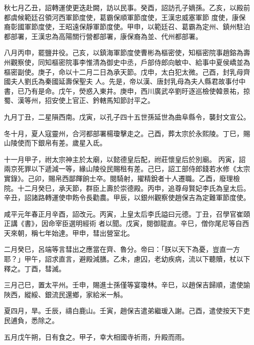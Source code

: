 \begin{pinyinscope}
 秋七月乙丑，詔轉運使更迭赴闕，訪以民事。癸酉，詔訪孔子嫡孫。乙亥，以殿前都虞候範廷召領河西軍節度使，葛霸保順軍節度使，王漢忠威塞軍節
 度使，康保裔彰國軍節度使，王昭遠保靜軍節度使。甲申，以範廷召、葛霸為定州、鎮州駐泊都部署，王漢忠為高陽關行營都部署，康保裔為並、代州都部署。



 八月丙申，罷鹽井役。己亥，以鎮海軍節度使曹彬為樞密使，知樞密院事趙鎔為壽州觀察使，同知樞密院事李惟清為御史中丞，戶部侍郎向敏中、給事中夏侯嶠並為樞密副使。庚子，命以十二月二日為承天節。戊申，太白犯太微。己酉，封乳母齊國夫人劉氏為秦國延壽保聖夫
 人。先是，帝以漢、唐封乳母為夫人縣君故事付中書，已乃有是命。戊午，熒惑入東井。庚申，西川廣武卒劉旴逐巡檢使韓景祐，掠蜀、漢等州，招安使上官正、鈐轄馬知節討平之。



 九月丁丑，二星隕西南。戊寅，以孔子四十五世孫延世為曲阜縣令，襲封文宣公。



 冬十月，夏人寇靈州，合河都部署楊瓊擊走之。己酉，葬太宗於永熙陵。丁巳，賜山陵使而下銀帛有差。歲星入氐。



 十一月甲子，祔太宗神主於太廟，以懿德皇后配，祔莊懷皇后於別廟。
 丙寅，詔兩京死罪以下遞減一等，緣山陵役民賜租有差。己巳，詔工部侍郎錢若水修《太宗實錄》。己卯，賜帛西鄙餫餉士卒。閱騎射，擢精銳者十人遷職。乙酉，廢理檢院。十二月癸巳，承天節，群臣上壽於崇德殿。丙申，追尊母賢妃李氏為皇太后。辛丑，詔諸路轉運使申飭令長勸農。甲辰，以銀州觀察使趙保吉為定難軍節度使。



 咸平元年春正月辛酉，詔改元。丙寅，上皇太后李氏謚曰元德。丁丑，召學官崔頤正講《書》，因命宰臣選明經術
 者以聞。戊寅，閱御龍直。辛巳，僧你尾尼等自西天來朝，稱七年始達。甲申，彗出營室北。



 二月癸巳，呂端等言彗出之應當在齊、魯分。帝曰：「朕以天下為憂，豈直一方耶？」甲午，詔求直言，避殿減膳。乙未，慮囚，老幼疾病，流以下聽贖，杖以下釋之。丁酉，彗滅。



 三月己巳，置太平州。壬申，賜進士孫僅等宴瓊林。辛巳，以趙保吉歸順，遣使諭陜西，縱綏、銀流民還鄉，家給米一斛。



 夏四月，旱。壬辰，禱白鹿山。壬寅，趙保吉遣弟繼瑗入謝。己酉，遣使按天下吏
 民逋負，悉除之。



 五月戊午朔，日有食之。甲子，幸大相國寺祈雨，升殿而雨。




\end{pinyinscope}
